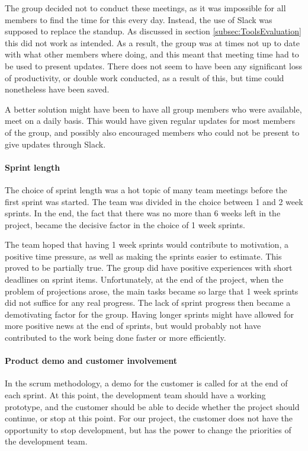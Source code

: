 \documentclass[11pt,a4paper,titlepage,oneside]{report}
\begin{document}
The group decided not to conduct these meetings, as it was impossible for all members to find the time for this every day. Instead, the use of Slack was supposed to replace the standup. As discussed in section \ref{subsec:ToolsEvaluation} this did not work as intended. As a result, the group was at times not up to date with what other members where doing, and this meant that meeting time had to be used to present updates. There does not seem to have been any significant loss of productivity, or double work conducted, as a result of this, but time could nonetheless have been saved. 

A better solution might have been to have all group members who were available, meet on a daily basis. This would have given regular updates for most members of the group, and possibly also encouraged members who could not be present to give updates through Slack. 

\paragraph{Sprint length}
The choice of sprint length was a hot topic of many team meetings before the first sprint was started. The team was divided in the choice between 1 and 2 week sprints. In the end, the fact that there was no more than 6 weeks left in the project, became the decisive factor in the choice of 1 week sprints. 

The team hoped that having 1 week sprints would contribute to motivation, a positive time pressure, as well as making the sprints easier to estimate. This proved to be partially true. The group did have positive experiences with short deadlines on sprint items. Unfortunately, at the end of the project, when the problem of projections arose, the main tasks became so large that 1 week sprints did not suffice for any real progress. The lack of sprint progress then became a demotivating factor for the group. Having longer sprints might have allowed for more positive news at the end of sprints, but would probably not have contributed to the work being done faster or more efficiently. 

\paragraph{Product demo and customer involvement}
In the scrum methodology, a demo for the customer is called for at the end of each sprint. At this point, the development team should have a working \gls{prototype}, and the customer should be able to decide whether the project should continue, or stop at this point. For our project, the customer does not have the opportunity to stop development, but has the power to change the priorities of the development team.
\end{document}
